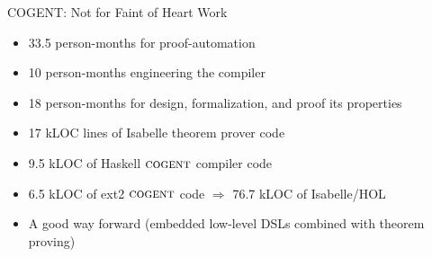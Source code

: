 \documentclass[aspectratio=169]{beamer}
\begin{document}

\begin{frame}{COGENT: Not for Faint of Heart}
Work
    \begin{itemize}
        \item 33.5 person-months for proof-automation
        \item 10 person-months engineering the compiler
        \item 18 person-months for design, formalization, and proof its properties
        \item 17 kLOC lines of Isabelle theorem prover code
        \item 9.5 kLOC of Haskell $\textsc{cogent}$ compiler code
        \item 6.5 kLOC of ext2 $\textsc{cogent}$ code $\Rightarrow$ 76.7 kLOC of Isabelle/HOL%
        \item A good way forward (embedded low-level DSLs combined with theorem proving)
    \end{itemize}
\end{frame}
\end{document}

